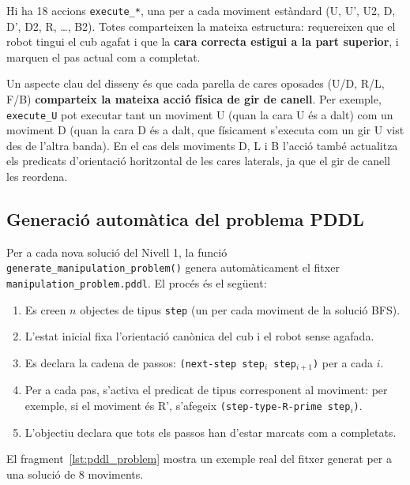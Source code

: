 \documentclass[12pt, a4paper]{article}
\begin{document}
Hi ha 18 accions \texttt{execute\_*}, una per a cada moviment estàndard (U, U', U2, D, D', D2, R, \ldots, B2). Totes comparteixen la mateixa estructura: requereixen que el robot tingui el cub agafat i que la \textbf{cara correcta estigui a la part superior}, i marquen el pas actual com a completat.

Un aspecte clau del disseny és que cada parella de cares oposades (U/D, R/L, F/B) \textbf{comparteix la mateixa acció física de gir de canell}. Per exemple, \texttt{execute\_U} pot executar tant un moviment U (quan la cara U és a dalt) com un moviment D (quan la cara D és a dalt, que físicament s'executa com un gir U vist des de l'altra banda). En el cas dels moviments D, L i B l'acció també actualitza els predicats d'orientació horitzontal de les cares laterals, ja que el gir de canell les reordena.

\subsection{Generació automàtica del problema PDDL}

Per a cada nova solució del Nivell 1, la funció \texttt{generate\_manipulation\_problem()} genera automàticament el fitxer \texttt{manipulation\_problem.pddl}. El procés és el següent:

\begin{enumerate}
  \item Es creen $n$ objectes de tipus \texttt{step} (un per cada moviment de la solució BFS).
  \item L'estat inicial fixa l'orientació canònica del cub i el robot sense agafada.
  \item Es declara la cadena de passos: \texttt{(next-step step$_i$ step$_{i+1}$)} per a cada $i$.
  \item Per a cada pas, s'activa el predicat de tipus corresponent al moviment: per exemple, si el moviment és R', s'afegeix \texttt{(step-type-R-prime step$_i$)}.
  \item L'objectiu declara que tots els passos han d'estar marcats com a completats.
\end{enumerate}

El fragment~\ref{lst:pddl_problem} mostra un exemple real del fitxer generat per a una solució de 8 moviments.
\end{document}
